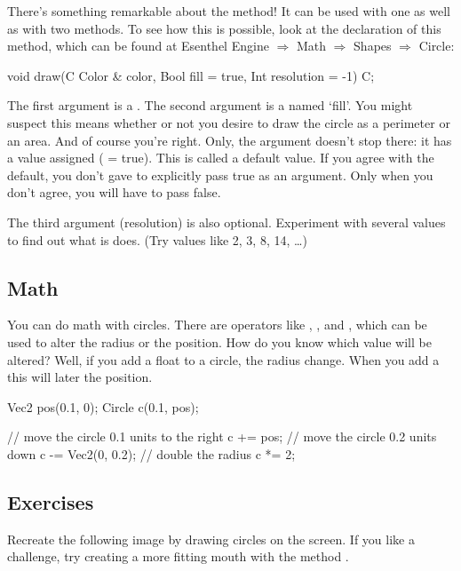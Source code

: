 There's something remarkable about the  method! It can be used with one as well as with two methods. To see how this is possible, look at the declaration of this method, which can be found at Esenthel Engine $\Rightarrow$ Math $\Rightarrow$ Shapes $\Rightarrow$ Circle:

\begin{code}
void draw(C Color & color, Bool fill = true, Int resolution = -1) C;
\end{code}

The first argument is a . The second argument is a  named `fill'. You might suspect this means whether or not you desire to draw the circle as a perimeter or an area. And of course you're right. Only, the argument doesn't stop there: it has a value assigned ( = true). This is called a default value. If you agree with the default, you don't gave to explicitly pass true as an argument. Only when you don't agree, you will have to pass false.

\begin{note}
The third argument (resolution) is also optional. Experiment with several values to find out what is does. (Try values like 2, 3, 8, 14, \ldots)
\end{note}

\subsection{Math}
You can do math with circles. There are operators like \eeOpp{+=}, \eeOpp{-=}, \eeOpp{/=} and \eeOpp{*=}, which can be used to alter the radius or the position. How do you know which value will be altered? Well, if you add a float to a circle, the radius change. When you add a  this will later the position.

\begin{code}
Vec2 pos(0.1, 0);
Circle c(0.1, pos);

// move the circle 0.1 units to the right
c += pos;
// move the circle 0.2 units down
c -= Vec2(0, 0.2);
// double the radius
c *= 2;
\end{code}

\subsection{Exercises}
Recreate the following image by drawing circles on the screen. If you like a challenge, try creating a more fitting mouth with the method .

